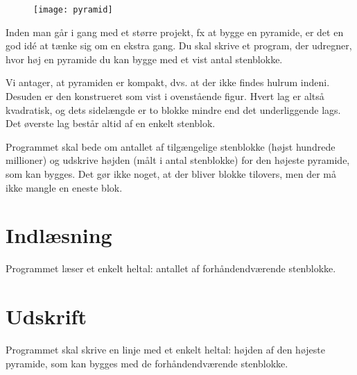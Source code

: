 
\begin{figure}[h!]
  \centering
  \texttt{[image: pyramid]}
\end{figure}

Inden man går i gang med et større projekt, fx at bygge en pyramide, er det en god idé at tænke sig om en ekstra gang.
Du skal skrive et program, der udregner, hvor høj en pyramide du kan bygge med et vist antal stenblokke.

Vi antager, at pyramiden er kompakt, dvs. at der ikke findes hulrum indeni.
Desuden er den konstrueret som vist i ovenstående figur.
Hvert lag er altså kvadratisk, og dets sidelængde er to blokke mindre end det underliggende lags.
Det øverste lag består altid af en enkelt stenblok.

Programmet skal bede om antallet af tilgængelige stenblokke (højst hundrede millioner) og udskrive højden (målt i antal stenblokke) for den højeste pyramide, som kan bygges.
Det gør ikke noget, at der bliver blokke tilovers, men der må ikke mangle en eneste blok.

\section*{Indlæsning}
Programmet læser et enkelt heltal: antallet af forhåndendværende stenblokke.

\section*{Udskrift}
Programmet skal skrive en linje med et enkelt heltal: højden af den højeste pyramide, som kan bygges med de forhåndendværende stenblokke.
